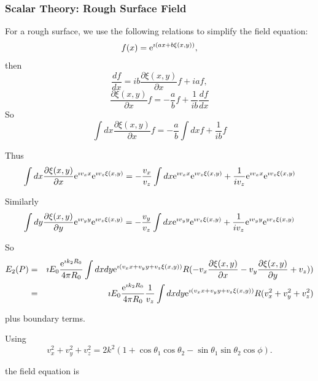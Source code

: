 \documentclass[11pt]{article}
\newcommand{\pder}[2]{\frac{\partial {#1}}{\partial {#2}}}
\newcommand{\der}[2]{\frac{d {#1}}{d {#2}}}
\newcommand{\e}{{\rm e}}
\begin{document}
{{{{%
\subsubsection{Scalar Theory: Rough Surface Field}

For a rough surface, we use the following relations to simplify the field equation:
  \begin{equation}
f(x)=\e^{\imath (ax+b\xi(x,y))},
  \end{equation}
then
  \begin{equation}
\der{f}{x}=ib\pder{\xi(x,y)}{x}f+iaf,
  \end{equation}
  \begin{equation}
\pder{\xi(x,y)}{x}f=-\frac{a}{b}f+\frac{1}{ib}\der{f}{x}
  \end{equation}
So
  \begin{equation}
\int dx\pder{\xi(x,y)}{x}f=-\frac{a}{b}\int dx f+\frac{1}{ib}f
  \end{equation}

Thus
  \begin{equation}
\int dx\pder{\xi(x,y)}{x}\e^{\imath v_{x}x}\e^{\imath v_{z}\xi(x,y)}=-\frac{v_{x}}{v_{z}}\int dx \e^{\imath v_{x}x}\e^{\imath v_{z}\xi(x,y)}+\frac{1}{iv_{z}}\e^{\imath v_{x}x}\e^{\imath v_{z}\xi(x,y)}
  \end{equation}

Similarly
  \begin{equation}
\int dy\pder{\xi(x,y)}{y}\e^{\imath v_{y}y}\e^{\imath v_{z}\xi(x,y)}=-\frac{v_{y}}{v_{z}}\int dx \e^{\imath v_{y}y}\e^{\imath v_{z}\xi(x,y)}+\frac{1}{iv_{z}}\e^{\imath v_{y}y}\e^{\imath v_{z}\xi(x,y)}
  \end{equation}

So
\begin{eqnarray}
E_{2}(P)&=&\imath E_{0}\frac{\e^{\imath k_{2}R_{0}}}{4\pi R_{0}}\int dx dy\e^{\imath( v_{x}x+v_{y}y+v_{z}\xi(x,y))}R(-v_{x}\pder{\xi(x,y)}{x}-v_{y}\pder{\xi(x,y)}{y}+v_{z})
)\\
&=&\imath E_{0}\frac{\e^{\imath k_{2}R_{0}}}{4\pi R_{0}}\frac{1}{v_{z}}\int dx dy\e^{\imath( v_{x}x+v_{y}y+v_{z}\xi(x,y))}R(v_{x}^{2}+v_{y}^{2}+v_{z}^{2})
\end{eqnarray}

plus boundary terms.

Using
$$v_{x}^{2}+v_{y}^{2}+v_{z}^{2}=2k^{2}\left(1+\cos\theta_{1}\cos\theta_{2}-\sin\theta_{1}\sin\theta_{2}\cos\phi\right).$$

the field equation is

}}}}
\end{document}
